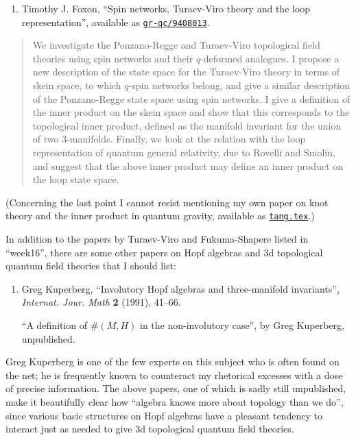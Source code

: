 \documentclass{article}
\def\tightlist{}
\begin{document}
\begin{enumerate}
\def\labelenumi{\arabic{enumi})}
\setcounter{enumi}{1}
\tightlist
\item
  Timothy J. Foxon, ``Spin networks, Turaev-Viro theory and the loop
  representation'', available as
  \href{http://xxx.lanl.gov/abs/gr-qc/9408013}{\texttt{gr-qc/9408013}}.
\end{enumerate}

\begin{quote}
We investigate the Ponzano-Regge and Turaev-Viro topological field
theories using spin networks and their \(q\)-deformed analogues. I
propose a new description of the state space for the Turaev-Viro theory
in terms of skein space, to which \(q\)-spin networks belong, and give a
similar description of the Ponzano-Regge state space using spin
networks. I give a definition of the inner product on the skein space
and show that this corresponds to the topological inner product, defined
as the manifold invariant for the union of two 3-manifolds. Finally, we
look at the relation with the loop representation of quantum general
relativity, due to Rovelli and Smolin, and suggest that the above inner
product may define an inner product on the loop state space.
\end{quote}

(Concerning the last point I cannot resist mentioning my own paper on
knot theory and the inner product in quantum gravity, available as
\href{http://math.ucr.edu/home/baez/tang.tex}{\texttt{tang.tex}}.)

In addition to the papers by Turaev-Viro and Fukuma-Shapere listed in
``week16'', there are some other papers on Hopf algebras and 3d
topological quantum field theories that I should list:

\begin{enumerate}
\def\labelenumi{\arabic{enumi})}
\setcounter{enumi}{2}
\item
  Greg Kuperberg, ``Involutory Hopf algebras and three-manifold
  invariants'', \emph{Internat. Jour. Math} \textbf{2} (1991), 41--66.

  ``A definition of \(\#(M,H)\) in the non-involutory case'', by Greg
  Kuperberg, unpublished.
\end{enumerate}

Greg Kuperberg is one of the few experts on this subject who is often
found on the net; he is frequently known to counteract my rhetorical
excesses with a dose of precise information. The above papers, one of
which is sadly still unpublished, make it beautifully clear how
``algebra knows more about topology than we do'', since various basic
structures on Hopf algebras have a pleasant tendency to interact just as
needed to give 3d topological quantum field theories.
\end{document}
